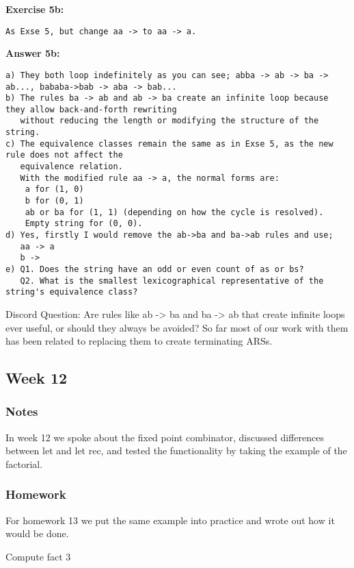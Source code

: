 \documentclass{article}
\theoremstyle{theorem}
\theoremstyle{definition}
\theoremstyle{remark}
\begin{document}
\textbf{Exercise 5b:}
\begin{verbatim}
As Exse 5, but change aa -> to aa -> a.
\end{verbatim}

\textbf{Answer 5b:}
\begin{verbatim}
a) They both loop indefinitely as you can see; abba -> ab -> ba -> ab..., bababa->bab -> aba -> bab...
b) The rules ba -> ab and ab -> ba create an infinite loop because they allow back-and-forth rewriting
   without reducing the length or modifying the structure of the string.
c) The equivalence classes remain the same as in Exse 5, as the new rule does not affect the 
   equivalence relation.
   With the modified rule aa -> a, the normal forms are:
    a for (1, 0)
    b for (0, 1)
    ab or ba for (1, 1) (depending on how the cycle is resolved).
    Empty string for (0, 0).
d) Yes, firstly I would remove the ab->ba and ba->ab rules and use;
   aa -> a
   b ->
e) Q1. Does the string have an odd or even count of as or bs?
   Q2. What is the smallest lexicographical representative of the string's equivalence class?
\end{verbatim}

Discord Question: Are rules like ab -> ba and ba -> ab that create infinite loops ever useful, or should they always be avoided? So far most of our work with them has been related to replacing them to create terminating ARSs.

\subsection{Week 12}
\subsubsection*{Notes}
In week 12 we spoke about the fixed point combinator, discussed differences between let and let rec, and tested the functionality by taking the example of the factorial.

\subsubsection*{Homework}
For homework 13 we put the same example into practice and wrote out how it would be done.

Compute fact 3
\end{document}
